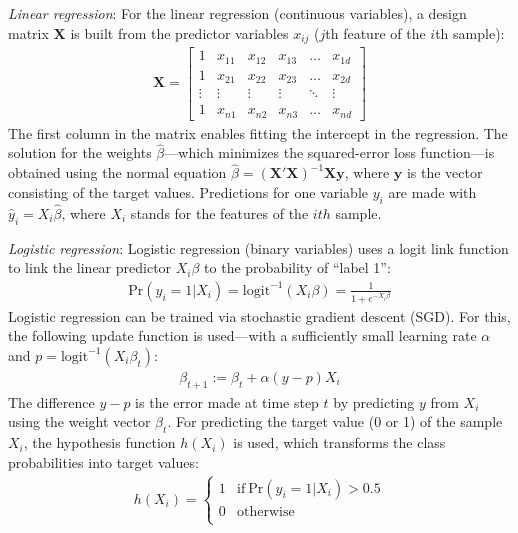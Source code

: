 \documentclass[a4paper]{article}
\begin{document}
\emph{Linear regression}: For the linear regression (continuous
variables), a design matrix $\mathbf{X}$ is built from the predictor
variables $x_{ij}$ ($j$th feature of the $i$th sample):
\begin{align}
\mathbf{X} = 
\begin{bmatrix}
    1 & x_{11} & x_{12} & x_{13} & \dots  & x_{1d} \\
    1 & x_{21} & x_{22} & x_{23} & \dots  & x_{2d} \\
    \vdots & \vdots & \vdots & \vdots & \ddots & \vdots \\
    1 & x_{n1} & x_{n2} & x_{n3} & \dots  & x_{nd}
\end{bmatrix}
\end{align}
The first column in the matrix enables fitting the intercept in the
regression. The solution for the weights $\hat{\beta}$---which
minimizes the squared-error loss function---is obtained using the
normal equation
$\hat{\beta} = (\mathbf{X}'\mathbf{X})^{-1}\mathbf{X}\mathbf{y}$,
where $\mathbf{y}$ is the vector consisting of the target
values. Predictions for one variable $y_i$ are made with
$\hat{y}_i = X_i\hat{\beta}$, where $X_i$ stands for the features of
the $ith$ sample.

\emph{Logistic regression}: Logistic regression (binary variables)
uses a logit link function to link the linear predictor $X_i\beta$ to
the probability of ``label 1'':
\begin{align}
  \text{Pr}(y_i = 1 | X_i) = \text{logit}^{-1}(X_i\beta) = \frac{1}{1 + e^{-X_i\beta}}
\end{align}
Logistic regression can be trained via stochastic gradient descent
(SGD). For this, the following update function is used---with a
sufficiently small learning rate $\alpha$ and
$p = \text{logit}^{-1}(X_i\beta_t)$:
\begin{align}
  \beta_{t+1} := \beta_{t} + \alpha (y-p)X_i
\end{align}
The difference $y - p$ is the error made at time step $t$ by predicting
$y$ from $X_i$ using the weight vector $\beta_{t}$.
For predicting the target value (0 or 1) of the sample $X_i$, the
hypothesis function $h(X_i)$ is used, which transforms the class
probabilities into target values:
\begin{align}
h (X_i) = 
\begin{cases}
1 & \text{if}~\text{Pr}(y_i = 1 | X_i) > 0.5\\
0 & \text{otherwise}\\
\end{cases}
\end{align}
\end{document}
